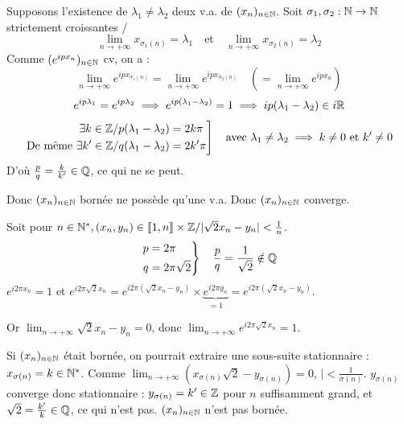 \begin{solution}
Supposons l'existence de $\lambda_1 \neq \lambda_2$ deux v.a. de $(x_n)_{n \in \mathbb N}$.
Soit $\sigma_1, \sigma_2 : \mathbb N \to \mathbb N$ strictement croissantes /
\[
\lim_{n \to +\infty} x_{\sigma_1(n)} = \lambda_1 \quad \text{et} \quad \lim_{n \to +\infty} x_{\sigma_2(n)} = \lambda_2
\]
Comme $(e^{i p x_n})_{n \in \mathbb N}$ cv, on a :
\[
\lim_{n \to +\infty} e^{i p x_{\sigma_1(n)}} = \lim_{n \to +\infty} e^{i p x_{\sigma_2(n)}} \quad \left(= \lim_{n \to +\infty} e^{i p x_n}\right)
\]
\[
e^{i p \lambda_1} = e^{i p \lambda_2} \implies e^{i p (\lambda_1 - \lambda_2)} = 1 \implies i p (\lambda_1 - \lambda_2) \in i \mathbb R
\]
\[
\left. \begin{aligned}
\exists k \in \mathbb Z / p(\lambda_1 - \lambda_2) &= 2k\pi \\
\text{De même } \exists k' \in \mathbb Z / q(\lambda_1 - \lambda_2) &= 2k'\pi
\end{aligned} \right] \quad \text{avec } \lambda_1 \neq \lambda_2 \implies k \neq 0 \text{ et } k' \neq 0
\]
D'où $\frac{p}{q} = \frac{k}{k'} \in \mathbb Q$, ce qui ne se peut.

Donc $(x_n)_{n \in \mathbb N}$ bornée ne possède qu'une v.a.
Donc $(x_n)_{n \in \mathbb N}$ converge.

Soit pour $n \in \mathbb N^*, (x_n, y_n) \in \llbracket 1, n \rrbracket \times \mathbb Z / |\sqrt{2} x_n - y_n| < \frac{1}{n}$.
\[
\left. \begin{aligned} p &= 2\pi \\ q &= 2\pi\sqrt{2} \end{aligned} \right\} \quad \frac{p}{q} = \frac{1}{\sqrt{2}} \notin \mathbb Q
\]
$e^{i 2\pi x_n} = 1$ et $e^{i 2\pi \sqrt{2} x_n} = e^{i 2\pi (\sqrt{2}x_n - y_n)} \times \underbrace{e^{i 2\pi y_n}}_{=1} = e^{i 2\pi (\sqrt{2}x_n - y_n)}$.

Or $\lim_{n \to +\infty} \sqrt{2} x_n - y_n = 0$, donc $\lim_{n \to +\infty} e^{i 2\pi \sqrt{2} x_n} = 1$.

Si $(x_n)_{n \in \mathbb N}$ était bornée, on pourrait extraire une sous-suite stationnaire :
$x_{\sigma(n)} = k \in \mathbb N^*$. Comme $\lim_{n \to +\infty} (x_{\sigma(n)}\sqrt{2} - y_{\sigma(n)}) = 0$, $| < \frac{1}{\sigma(n)}$.
$y_{\sigma(n)}$ converge donc stationnaire : $y_{\sigma(n)} = k' \in \mathbb Z$ pour $n$ suffisamment grand, et $\sqrt{2} = \frac{k'}{k} \in \mathbb Q$, ce qui n'est pas.
$(x_n)_{n \in \mathbb N}$ n'est pas bornée.
\end{solution}


